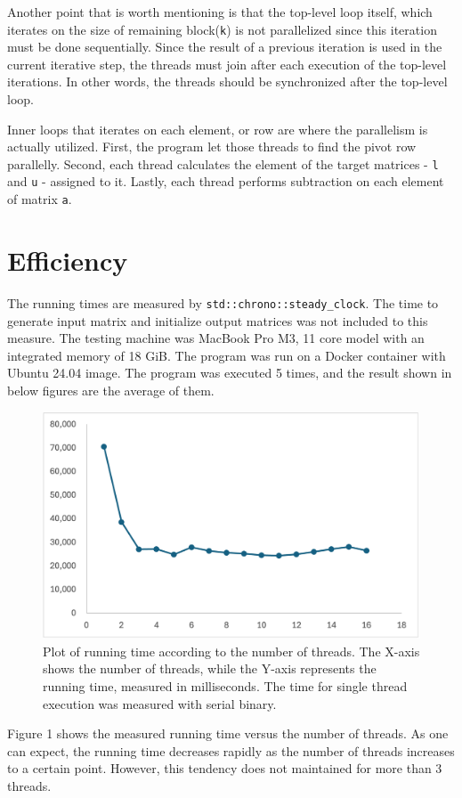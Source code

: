 \documentclass{article}
\begin{document}
Another point that is worth mentioning is that the top-level loop itself, which
iterates on the size of remaining block(\verb|k|) is not parallelized since 
this iteration must be done sequentially. Since the result of a previous 
iteration is used in the current iterative step, the threads must join after
each execution of the top-level iterations. In other words, the threads should
be synchronized after the top-level loop.

Inner loops that iterates on each element, or row are where the parallelism is
actually utilized. First, the program let those threads to find the pivot row 
parallelly. Second, each thread calculates the element of the target matrices
- \verb|l| and \verb|u| - assigned to it. Lastly, each thread performs 
subtraction on each element of matrix \verb|a|.

\section{Efficiency}
The running times are measured by \verb|std::chrono::steady_clock|. The time to 
generate input matrix and initialize output matrices was not included to this 
measure. The testing machine was MacBook Pro M3, 11 core model with an 
integrated memory of 18 GiB. The program was run on a Docker container with
Ubuntu 24.04 image. The program was executed 5 times, and the result shown in 
below figures are the average of them.

\begin{figure}[h]
\centering
\includegraphics[width=.75\textwidth]{figure1.png}
\caption{
    Plot of running time according to the number of threads. The X-axis shows 
    the number of threads, while the Y-axis represents the running time, 
    measured in milliseconds. The time for single thread execution was measured
    with serial binary. 
}
\end{figure}

Figure 1 shows the measured running time versus the number of threads. As one
can expect, the running time decreases rapidly as the number of threads 
increases to a certain point. However, this tendency does not maintained for
more than 3 threads. 
\end{document}
